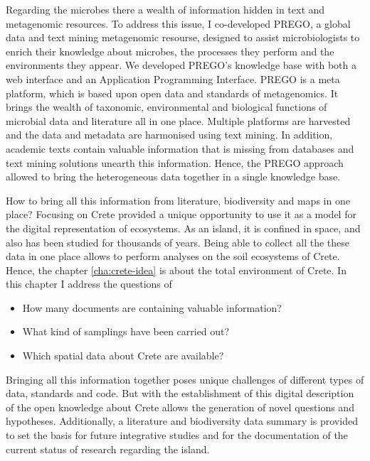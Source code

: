 \documentclass[
11pt, %
english, %
singlespacing, %
liststotoc, %
toctotoc, %
headsepline, %
]{MastersDoctoralThesis} %
\begin{document}
Regarding the microbes there a wealth of information hidden in text and metagenomic resources.
To address this issue, I co-developed PREGO, a global data and text mining metagenomic resourse, designed to assist microbiologists
to enrich their knowledge about microbes, the processes they perform and the environments 
they appear. We developed PREGO's knowledge base with both a web interface and an Application Programming Interface.
PREGO is a meta platform, which is based upon open data and standards of metagenomics. 
It brings the wealth of taxonomic, environmental and biological functions of 
microbial data and literature all in one place. Multiple platforms are harvested and the data 
and metadata are harmonised using text mining. In addition, academic texts contain 
valuable information that is missing from databases and text mining solutions unearth 
this information. Hence, the PREGO approach allowed to bring the heterogeneous
data together in a single knowledge base. 

How to bring all this information from literature, biodiversity and maps in one place? Focusing on Crete
provided a unique opportunity to use it as a model for the digital representation of ecosystems. 
As an island, it is confined in space, and also has been studied for thousands of years.
Being able to collect all the these data in one place allows to perform analyses on the soil ecosystems of Crete.
Hence, the chapter \ref{cha:crete-idea} is about the total environment of Crete.
In this chapter I address the questions of 

\begin{itemize}
    \item How many documents are containing valuable information?
    \item What kind of samplings have been carried out?
    \item Which spatial data about Crete are available? 
\end{itemize}

Bringing all this information together poses unique challenges of different types of data, standards and code. 
But with the establishment of this digital description of the open knowledge about Crete allows the generation of novel questions and hypotheses.
Additionally, a literature and biodiversity data summary is 
provided to set the basis for future integrative studies and for the documentation of the current status of 
research regarding the island.
\end{document}
